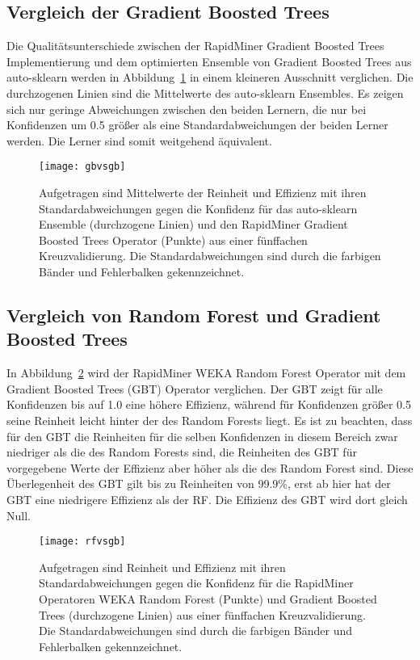 \subsection{Vergleich der Gradient Boosted Trees}
Die Qualitätsunterschiede zwischen der RapidMiner Gradient Boosted Trees Implementierung und dem optimierten Ensemble von Gradient Boosted Trees aus auto-sklearn werden in Abbildung~\ref{figgbvsgb} in einem kleineren Ausschnitt verglichen.
Die durchzogenen Linien sind die Mittelwerte des auto-sklearn Ensembles.
Es zeigen sich nur geringe Abweichungen zwischen den beiden Lernern, die nur bei Konfidenzen um 0.5 größer als eine Standardabweichungen der beiden Lerner werden.
Die Lerner sind somit weitgehend äquivalent.
\begin{figure}
  \centering
  \texttt{[image: gbvsgb]}
\vspace{-1em}
    \caption{Aufgetragen sind Mittelwerte der Reinheit und Effizienz mit ihren Standardabweichungen gegen die Konfidenz für das auto-sklearn Ensemble (durchzogene Linien) und den RapidMiner Gradient Boosted Trees Operator (Punkte) aus einer fünffachen Kreuzvalidierung. Die Standardabweichungen sind durch die farbigen Bänder und Fehlerbalken gekennzeichnet.}
  \label{figgbvsgb}
\end{figure}


\subsection{Vergleich von Random Forest und Gradient Boosted Trees}
In Abbildung~\ref{figrfvsgb} wird der RapidMiner WEKA Random Forest Operator mit dem Gradient Boosted Trees (GBT) Operator verglichen.
Der GBT zeigt für alle Konfidenzen bis auf 1.0 eine höhere Effizienz, während für Konfidenzen größer 0.5 seine Reinheit leicht hinter der des Random Forests liegt.
Es ist zu beachten, dass für den GBT die Reinheiten für die selben Konfidenzen in diesem Bereich zwar niedriger als die des Random Forests sind, die Reinheiten des GBT für vorgegebene Werte der Effizienz aber höher als die des Random Forest sind.
Diese Überlegenheit des GBT gilt bis zu Reinheiten von 99.9\%, erst ab hier hat der GBT eine niedrigere Effizienz als der RF.
Die Effizienz des GBT wird dort gleich Null.
\begin{figure}
  \centering
  \texttt{[image: rfvsgb]}
\vspace{-1em}
    \caption{Aufgetragen sind Reinheit und Effizienz mit ihren Standardabweichungen gegen die Konfidenz für die RapidMiner Operatoren WEKA Random Forest (Punkte) und Gradient Boosted Trees (durchzogene Linien) aus einer fünffachen Kreuzvalidierung. Die Standardabweichungen sind durch die farbigen Bänder und Fehlerbalken gekennzeichnet.}
  \label{figrfvsgb}
\end{figure}






